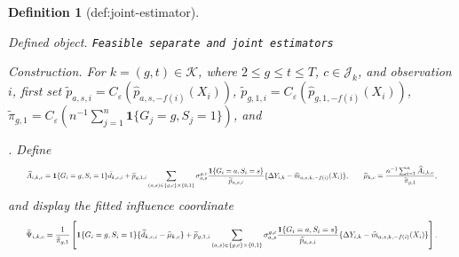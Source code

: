 \documentclass{article}
\newtheorem{definition}{Definition}
\begin{document}
\begin{definition}[def:joint-estimator]\label{def:joint-estimator}
\par\smallskip\noindent\emph{Defined object.} \texttt{Feasible separate and joint estimators}
\par\smallskip\noindent\emph{Construction.} For \(k=(g,t)\in\mathcal K\), where \(2\le g\le t\le T\), \(c\in\mathcal J_k\), and observation \(i\), first set \(\widetilde p_{a,s,i}=C_\varepsilon(\widehat p_{a,s,-f(i)}(X_i))\), \(\widetilde p_{g,1,i}=C_\varepsilon(\widehat p_{g,1,-f(i)}(X_i))\), \(\widetilde\pi_{g,1}=C_\varepsilon(n^{-1}\sum_{j=1}^n\mathbf 1\{G_j=g,S_j=1\})\), and \leavevmode\par\noindent {}\par\noindent. Define \[
\makebox[\linewidth][c]{\resizebox{0.98\linewidth}{!}{\leavevmode\par\noindent \makebox[\linewidth][c]{\resizebox{0.98\linewidth}{!}{\(\displaystyle \displaystyle \widehat A_{i,k,c}=\mathbf 1\{G_i=g,S_i=1\}\widehat d_{k,c,i}+\widetilde p_{g,1,i}\sum_{(a,s)\in\{g,c\}\times\{0,1\}}\sigma_{a,s}^{g,c}\frac{\mathbf 1\{G_i=a,S_i=s\}}{\widetilde p_{a,s,i}}\{\Delta Y_{i,k}-\widehat m_{a,s,k,-f(i)}(X_i)\},\qquad \widehat\mu_{k,c}=\frac{n^{-1}\sum_{i=1}^n\widehat A_{i,k,c}}{\widetilde\pi_{g,1}},\)}}\par\noindent}}
\] and display the fitted influence coordinate \[
\makebox[\linewidth][c]{\resizebox{0.98\linewidth}{!}{\leavevmode\par\noindent \makebox[\linewidth][c]{\resizebox{0.98\linewidth}{!}{\(\displaystyle \displaystyle \widehat\Psi_{i,k,c}=\frac{1}{\widetilde\pi_{g,1}}\left[\mathbf 1\{G_i=g,S_i=1\}\{\widehat d_{k,c,i}-\widehat\mu_{k,c}\}+\widetilde p_{g,1,i}\sum_{(a,s)\in\{g,c\}\times\{0,1\}}\sigma_{a,s}^{g,c}\frac{\mathbf 1\{G_i=a,S_i=s\}}{\widetilde p_{a,s,i}}\{\Delta Y_{i,k}-\widehat m_{a,s,k,-f(i)}(X_i)\}\right].\)}}\par\noindent}}
\]
\end{definition}
\end{document}
